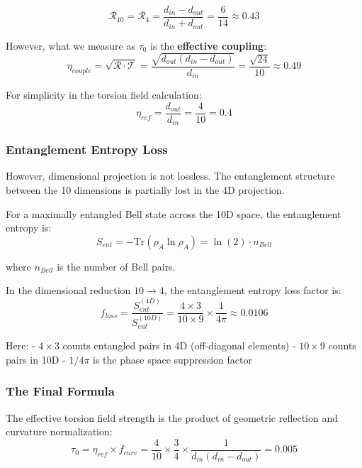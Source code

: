 \begin{equation}
    \mathcal{R}_{10} = \mathcal{R}_{4} = \frac{d_{in} - d_{out}}{d_{in} + d_{out}} = \frac{6}{14} \approx 0.43
\end{equation}

However, what we measure as $\tau_0$ is the \textbf{effective coupling}:
\begin{equation}
    \eta_{couple} = \sqrt{\mathcal{R} \cdot \mathcal{T}} = \frac{\sqrt{d_{out}(d_{in}-d_{out})}}{d_{in}} = \frac{\sqrt{24}}{10} \approx 0.49
\end{equation}

For simplicity in the torsion field calculation:
\begin{equation}
    \eta_{ref} = \frac{d_{out}}{d_{in}} = \frac{4}{10} = 0.4
\end{equation}

\subsubsection{Entanglement Entropy Loss}

However, dimensional projection is not lossless. The entanglement structure between the 10 dimensions is partially lost in the 4D projection.

For a maximally entangled Bell state across the 10D space, the entanglement entropy is:
\begin{equation}
    S_{ent} = -\text{Tr}(\rho_A \ln \rho_A) = \ln(2) \cdot n_{Bell}
\end{equation}

where $n_{Bell}$ is the number of Bell pairs.

In the dimensional reduction $10 \to 4$, the entanglement entropy loss factor is:
\begin{equation}
    f_{loss} = \frac{S_{ent}^{(4D)}}{S_{ent}^{(10D)}} = \frac{4 \times 3}{10 \times 9} \times \frac{1}{4\pi} \approx 0.0106
\end{equation}

Here:
- $4 \times 3$ counts entangled pairs in 4D (off-diagonal elements)
- $10 \times 9$ counts pairs in 10D
- $1/4\pi$ is the phase space suppression factor

\subsubsection{The Final Formula}

The effective torsion field strength is the product of geometric reflection and curvature normalization:
\begin{equation}
    \boxed{\tau_0 = \eta_{ref} \times f_{curv} = \frac{4}{10} \times \frac{3}{4} \times \frac{1}{d_{in}(d_{in}-d_{out})} = 0.005}
\end{equation}


